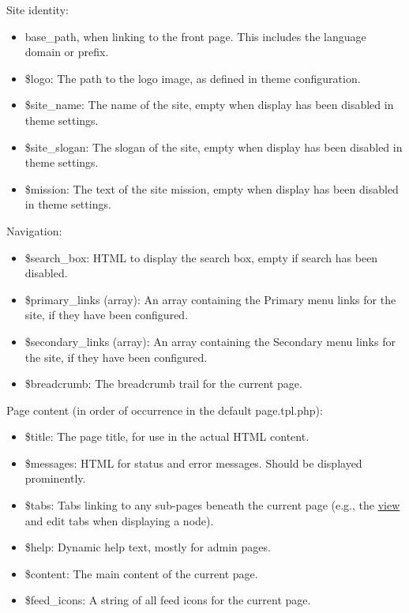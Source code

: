 Site identity:\begin{itemize}
\item {}
base\_\-path, when linking to the front page. This includes the language domain or prefix.\item \$logo: The path to the logo image, as defined in theme configuration.\item \$site\_\-name: The name of the site, empty when display has been disabled in theme settings.\item \$site\_\-slogan: The slogan of the site, empty when display has been disabled in theme settings.\item \$mission: The text of the site mission, empty when display has been disabled in theme settings.\end{itemize}


Navigation:\begin{itemize}
\item \$search\_\-box: HTML to display the search box, empty if search has been disabled.\item \$primary\_\-links (array): An array containing the Primary menu links for the site, if they have been configured.\item \$secondary\_\-links (array): An array containing the Secondary menu links for the site, if they have been configured.\item \$breadcrumb: The breadcrumb trail for the current page.\end{itemize}


Page content (in order of occurrence in the default page.tpl.php):\begin{itemize}
\item \$title: The page title, for use in the actual HTML content.\item \$messages: HTML for status and error messages. Should be displayed prominently.\item \$tabs: Tabs linking to any sub-pages beneath the current page (e.g., the \hyperlink{classview}{view} and edit tabs when displaying a node).\item \$help: Dynamic help text, mostly for admin pages.\item \$content: The main content of the current page.\item \$feed\_\-icons: A string of all feed icons for the current page.\end{itemize}


